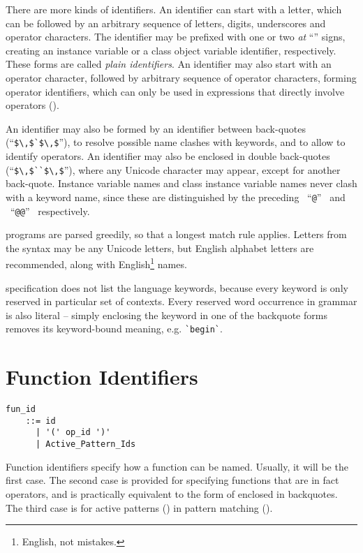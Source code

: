 There are more kinds of identifiers. An identifier can start with a letter, which can be followed by an arbitrary sequence of letters, digits, underscores and operator characters. The identifier may be prefixed with one or two {\em at} ``'' signs, creating an instance variable or a class object variable identifier, respectively. These forms are called {\em plain identifiers}. An identifier may also start with an operator character, followed by arbitrary sequence of operator characters, forming operator identifiers, which can only be used in expressions that directly involve operators (). 

An identifier may also be formed by an identifier between back-quotes (``\lstinline!$\,$`$\,$!''), to resolve possible name clashes with \Aml keywords, and to allow to identify operators. An identifier may also be enclosed in double back-quotes (``\lstinline!$\,$``$\,$!''), where any Unicode character may appear, except for another back-quote. Instance variable names and class instance variable names never clash with a keyword name, since these are distinguished by the preceding ~``\lstinline!@!''~ and ~``\lstinline!@@!''~ respectively. 

\Aml programs are parsed greedily, so that a longest match rule applies. Letters from the syntax may be any Unicode letters, but English alphabet letters are recommended, along with English\footnote{English, not mistakes.} names.

\Aml specification does not list the language keywords, because every keyword is only reserved in particular set of contexts. Every reserved word occurrence in grammar is also literal -- simply enclosing the keyword in one of the backquote forms removes its keyword-bound meaning, e.g. \lstinline[deletekeywords={begin}]!`begin`!. 





\section{Function Identifiers}
\label{sec:function-identifiers}

\syntax\begin{lstlisting}
fun_id 
    ::= id
      | '(' op_id ')'
      | Active_Pattern_Ids
\end{lstlisting}

Function identifiers specify how a function can be named. Usually, it will be the first case. The second case is provided for specifying functions that are in fact operators, and is practically equivalent to the form of  enclosed in backquotes. The third case is for active patterns () in pattern matching (). 





